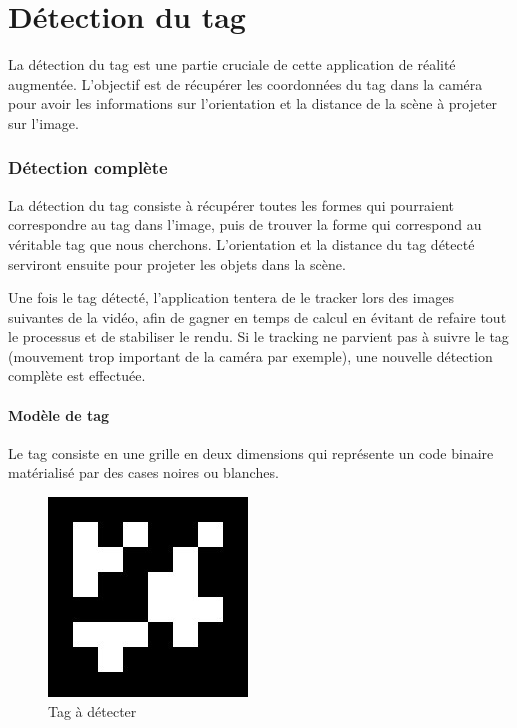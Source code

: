 \part{Détection du tag}

La détection du tag est une partie cruciale de cette application de réalité augmentée. L'objectif est de récupérer les coordonnées du tag dans la caméra pour avoir les informations sur l'orientation et la distance de la scène à projeter sur l'image.

    \section{Détection complète}

    La détection du tag consiste à récupérer toutes les formes qui pourraient correspondre au tag dans l'image, puis de trouver la forme qui correspond au véritable tag que nous cherchons. L'orientation et la distance du tag détecté serviront ensuite pour projeter les objets dans la scène.

    Une fois le tag détecté, l'application tentera de le tracker lors des images suivantes de la vidéo, afin de gagner en temps de calcul en évitant de refaire tout le processus et de stabiliser le rendu. Si le tracking ne parvient pas à suivre le tag (mouvement trop important de la caméra par exemple), une nouvelle détection complète est effectuée.

        \subsection{Modèle de tag}

        Le tag consiste en une grille en deux dimensions qui représente un code binaire matérialisé par des cases noires ou blanches.

        \begin{figure}[!h]
            \centering
            \includegraphics[scale=0.25]{img/marker.jpeg}
            \caption{Tag à détecter}
        \end{figure}

